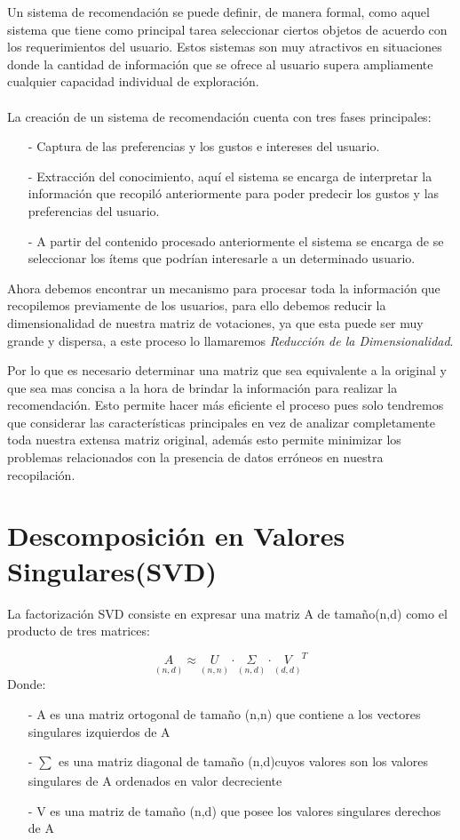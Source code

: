 \documentclass{article}
\begin{document}
Un sistema de recomendación se puede definir, de manera formal, como aquel sistema que tiene como principal tarea seleccionar ciertos objetos de acuerdo con los requerimientos del usuario. Estos sistemas son muy atractivos en situaciones donde la cantidad de información que se ofrece al usuario supera ampliamente cualquier capacidad individual de exploración.\\\\
La creación de un sistema de recomendación cuenta con tres fases principales:
\begin{enumerate}
	\item[-] Captura de las preferencias y los gustos e intereses del usuario.
	\item[-] Extracción del conocimiento, aquí el sistema se encarga de interpretar la información que recopiló anteriormente para poder predecir los gustos y las preferencias del usuario.
	\item[-] A partir del contenido procesado anteriormente el sistema se encarga de se seleccionar los ítems que podrían interesarle a un determinado usuario.
\end{enumerate}

Ahora debemos encontrar un mecanismo para procesar toda la información que recopilemos previamente de los usuarios, para ello debemos reducir la dimensionalidad de nuestra matriz de votaciones, ya que esta puede ser muy grande y dispersa, a este proceso lo llamaremos \textit{Reducción de la Dimensionalidad}. 

Por lo que es necesario determinar una matriz que sea equivalente a la original y que sea mas concisa a la hora de brindar la información para realizar la recomendación. Esto permite hacer más eficiente el proceso pues solo tendremos que considerar las características principales en vez de analizar completamente toda nuestra extensa matriz original, además esto permite minimizar los problemas relacionados con la presencia de datos erróneos en nuestra recopilación.

\section{Descomposición en Valores Singulares(SVD)}

La factorización SVD consiste en expresar una matriz A de tamaño(n,d) como el producto de tres matrices:

$$ \underset{(n, d)}A \approx \underset{(n, n)}U \cdot \underset{(n, d)}\Sigma \cdot \underset{(d, d)} V^T  $$
Donde:
\begin{enumerate}
	\item[-] A es una matriz ortogonal de tamaño (n,n) que contiene a los vectores singulares izquierdos de A
	\item[-] $\sum_{}^{}$ es una matriz diagonal de tamaño (n,d)cuyos valores son los valores singulares de A ordenados en valor decreciente
	\item[-] V es una matriz de tamaño (n,d) que posee los valores singulares derechos de A
\end{enumerate}
\end{document}
